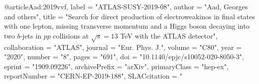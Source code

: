 @article{Aad:2019vvf,
      label          = "ATLAS-SUSY-2019-08",
      author         = "Aad, Georges and others",
      title          = "{Search for direct production of electroweakinos in final
                        states with one lepton, missing transverse momentum and a
                        Higgs boson decaying into two $b$-jets in $pp$ collisions
                        at $\sqrt{s}=13$ TeV with the ATLAS detector}",
      collaboration  = "ATLAS",
      journal        = "Eur. Phys. J.",
      volume         = "C80",
      year           = "2020",
      number         = "8",
      pages          = "691",
      doi            = "10.1140/epjc/s10052-020-8050-3",
      eprint         = "1909.09226",
      archivePrefix  = "arXiv",
      primaryClass   = "hep-ex",
      reportNumber   = "CERN-EP-2019-188",
      SLACcitation   = "%
}

